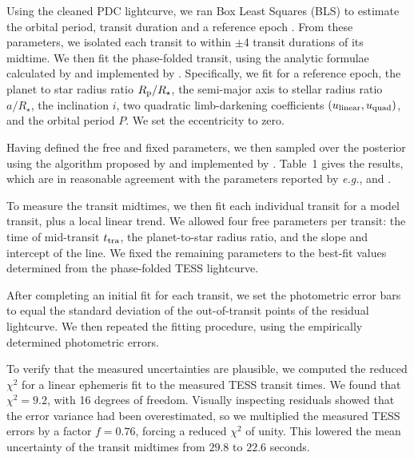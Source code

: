 \documentclass[12pt,twocolumn,tighten]{aastex62}
\begin{document}
Using the cleaned PDC lightcurve, we ran Box Least Squares (BLS) to
estimate the orbital period, transit duration and a reference epoch
\citep{kovacs_box-fitting_2002}.  From these parameters, we isolated
each transit to within $\pm$4 transit durations of its midtime.  We
then fit the phase-folded transit, using the analytic formulae
calculated by \citet{mandel_analytic_2002} and implemented by
\citet{kreidberg_batman_2015}.  Specifically, we fit for a reference
epoch, the planet to star radius ratio $R_{\rm p}/R_\star$, the
semi-major axis to stellar radius ratio $a/R_\star$, the inclination
$i$, two quadratic limb-darkening coefficients $(u_{\rm linear},
u_{\rm quad})$, and the orbital period $P$.  We set the eccentricity
to zero. 

Having defined the free and fixed parameters, we then sampled over the
posterior using the algorithm proposed by
\citet{goodman_ensemble_2010} and implemented by
\citet{foreman-mackey_emcee_2013}.  Table~1 gives the results, which
are in reasonable agreement with the parameters reported by {\it
e.g.}, \citet{southworth_high-precision_2009} and
\citet{huitson_gemini_2017}.

To measure the transit midtimes, we then fit  each individual transit
for a model transit, plus a local linear trend.  We allowed four free 
parameters per transit: the time of
mid-transit $t_{\rm tra}$, the planet-to-star radius ratio, and the
slope and intercept of the line.  We fixed the remaining
parameters%
to the best-fit values determined from the
phase-folded TESS lightcurve.

After completing an initial fit for each transit, we set the
photometric error bars to equal the standard deviation of the
out-of-transit points of the residual lightcurve.  We then repeated
the fitting procedure, using the empirically determined photometric
errors.

To verify that the measured uncertainties are plausible, we computed
the reduced $\chi^2$ for a linear ephemeris fit to the measured TESS
transit times.  We found that $\chi^2 = 9.2$, with 16 degrees of
freedom.  Visually inspecting residuals showed that the error variance
had been overestimated, so we multiplied the measured TESS errors by a
factor $f=0.76$, forcing a reduced $\chi^2$ of unity.  This lowered
the mean uncertainty of the transit midtimes from $29.8$ to $22.6$
seconds.
\end{document}
